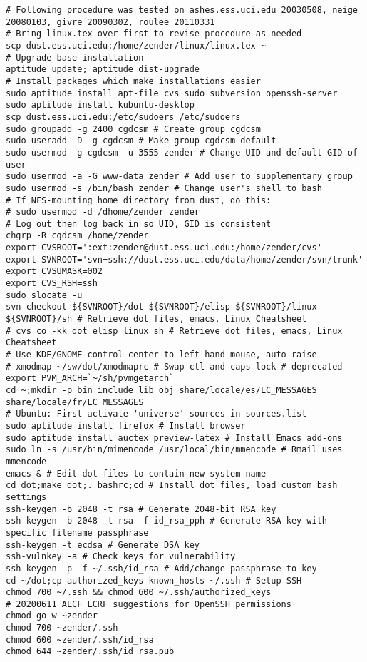 \documentclass[12pt,twoside]{article}
\begin{document}
\begin{verbatim}
# Following procedure was tested on ashes.ess.uci.edu 20030508, neige 20080103, givre 20090302, roulee 20110331
# Bring linux.tex over first to revise procedure as needed
scp dust.ess.uci.edu:/home/zender/linux/linux.tex ~
# Upgrade base installation
aptitude update; aptitude dist-upgrade 
# Install packages which make installations easier
sudo aptitude install apt-file cvs sudo subversion openssh-server
sudo aptitude install kubuntu-desktop
scp dust.ess.uci.edu:/etc/sudoers /etc/sudoers
sudo groupadd -g 2400 cgdcsm # Create group cgdcsm
sudo useradd -D -g cgdcsm # Make group cgdcsm default
sudo usermod -g cgdcsm -u 3555 zender # Change UID and default GID of user
sudo usermod -a -G www-data zender # Add user to supplementary group
sudo usermod -s /bin/bash zender # Change user's shell to bash
# If NFS-mounting home directory from dust, do this:
# sudo usermod -d /dhome/zender zender 
# Log out then log back in so UID, GID is consistent
chgrp -R cgdcsm /home/zender
export CVSROOT=':ext:zender@dust.ess.uci.edu:/home/zender/cvs'
export SVNROOT='svn+ssh://dust.ess.uci.edu/data/home/zender/svn/trunk'
export CVSUMASK=002
export CVS_RSH=ssh
sudo slocate -u
svn checkout ${SVNROOT}/dot ${SVNROOT}/elisp ${SVNROOT}/linux ${SVNROOT}/sh # Retrieve dot files, emacs, Linux Cheatsheet
# cvs co -kk dot elisp linux sh # Retrieve dot files, emacs, Linux Cheatsheet
# Use KDE/GNOME control center to left-hand mouse, auto-raise 
# xmodmap ~/sw/dot/xmodmaprc # Swap ctl and caps-lock # deprecated
export PVM_ARCH=`~/sh/pvmgetarch`
cd ~;mkdir -p bin include lib obj share/locale/es/LC_MESSAGES share/locale/fr/LC_MESSAGES
# Ubuntu: First activate 'universe' sources in sources.list
sudo aptitude install firefox # Install browser
sudo aptitude install auctex preview-latex # Install Emacs add-ons
sudo ln -s /usr/bin/mimencode /usr/local/bin/mmencode # Rmail uses mmencode
emacs & # Edit dot files to contain new system name
cd dot;make dot;. bashrc;cd # Install dot files, load custom bash settings
ssh-keygen -b 2048 -t rsa # Generate 2048-bit RSA key
ssh-keygen -b 2048 -t rsa -f id_rsa_pph # Generate RSA key with specific filename passphrase
ssh-keygen -t ecdsa # Generate DSA key
ssh-vulnkey -a # Check keys for vulnerability
ssh-keygen -p -f ~/.ssh/id_rsa # Add/change passphrase to key
cd ~/dot;cp authorized_keys known_hosts ~/.ssh # Setup SSH
chmod 700 ~/.ssh && chmod 600 ~/.ssh/authorized_keys
# 20200611 ALCF LCRF suggestions for OpenSSH permissions
chmod go-w ~zender
chmod 700 ~zender/.ssh
chmod 600 ~zender/.ssh/id_rsa
chmod 644 ~zender/.ssh/id_rsa.pub

\end{verbatim}
\end{document}
